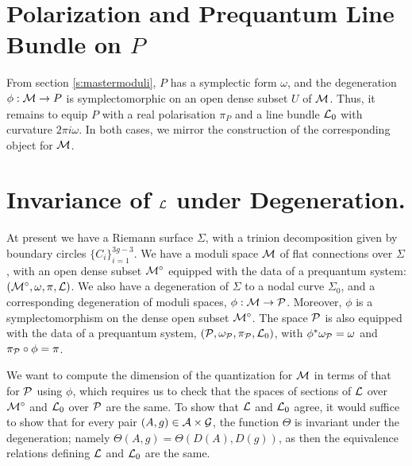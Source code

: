 \section{Polarization and Prequantum Line Bundle on $P$}
	From section \ref{s:mastermoduli}, $P$ has a symplectic form $\omega$, and the degeneration $\phi:\mathcal{M}\to P$ is symplectomorphic on an open dense subset $U$ of $\mathcal{M}$. Thus, it remains to equip $P$ with a real polarisation $\pi_P$ and a line bundle $\mathcal{L}_0$ with curvature $2\pi i \omega$. In both cases, we mirror the construction of the corresponding object for $\mathcal{M}$.

\section{Invariance of $\mathcal{L}$ under Degeneration.}
	At present we have a Riemann surface $\Sigma$, with a trinion decomposition given by boundary circles $\{C_i\}_{i=1}^{3g-3}$. We have a moduli space $\mathcal{M}$ of flat connections over $\Sigma$, with an open dense subset $\mathcal{M}^\circ$ equipped with the data of a prequantum system: $(\mathcal{M}^\circ, \omega, \pi, \mathcal{L})$. We also have a degeneration of $\Sigma$ to a nodal curve $\Sigma_0$, and a corresponding degeneration of moduli spaces, $\phi:\mathcal{M}\to \mathcal{P}$. Moreover, $\phi$ is a symplectomorphism on the dense open subset $\mathcal{M}^\circ$. The space $\mathcal{P}$ is also equipped with the data of a prequantum system, $(\mathcal{P}, \omega_{\mathcal{P}}, \pi_{\mathcal{P}}, \mathcal{L}_0)$, with $\phi^\ast \omega_{\mathcal{P}} = \omega$ and $\pi_{\mathcal{P}}\circ\phi = \pi$. 
	
	We want to compute the dimension of the quantization for $\mathcal{M}$ in terms of that for $\mathcal{P}$ using $\phi$, which requires us to check that the spaces of sections of $\mathcal{L}$ over $\mathcal{M}^\circ$ and $\mathcal{L}_0$ over $\mathcal{P}$ are the same. To show that $\mathcal{L}$ and $\mathcal{L}_0$ agree, it would suffice to show that for every pair $(A,g)\in \mathcal{A}\times \mathcal{G}$, the function $\Theta$ is invariant under the degeneration; namely $\Theta(A,g) = \Theta(D(A), D(g))$, as then the equivalence relations defining $\mathcal{L}$ and $\mathcal{L}_0$ are the same.
	
